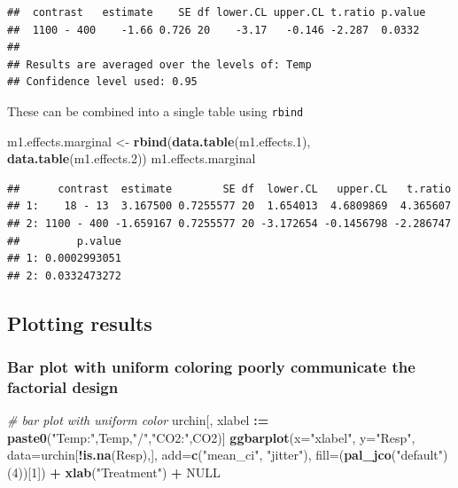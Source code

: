 \documentclass[]{book}
\newenvironment{Shaded}{\begin{snugshade}}{\end{snugshade}}
\newcommand{\KeywordTok}[1]{\textcolor[rgb]{0.13,0.29,0.53}{\textbf{#1}}}
\newcommand{\DataTypeTok}[1]{\textcolor[rgb]{0.13,0.29,0.53}{#1}}
\newcommand{\DecValTok}[1]{\textcolor[rgb]{0.00,0.00,0.81}{#1}}
\newcommand{\StringTok}[1]{\textcolor[rgb]{0.31,0.60,0.02}{#1}}
\newcommand{\CommentTok}[1]{\textcolor[rgb]{0.56,0.35,0.01}{\textit{#1}}}
\newcommand{\OtherTok}[1]{\textcolor[rgb]{0.56,0.35,0.01}{#1}}
\newcommand{\OperatorTok}[1]{\textcolor[rgb]{0.81,0.36,0.00}{\textbf{#1}}}
\newcommand{\ErrorTok}[1]{\textcolor[rgb]{0.64,0.00,0.00}{\textbf{#1}}}
\newcommand{\NormalTok}[1]{#1}
\begin{document}
\begin{verbatim}
##  contrast   estimate    SE df lower.CL upper.CL t.ratio p.value
##  1100 - 400    -1.66 0.726 20    -3.17   -0.146 -2.287  0.0332 
## 
## Results are averaged over the levels of: Temp 
## Confidence level used: 0.95
\end{verbatim}

These can be combined into a single table using \texttt{rbind}

\begin{Shaded}
\begin{Highlighting}[]
\NormalTok{m1.effects.marginal <-}\StringTok{ }\KeywordTok{rbind}\NormalTok{(}\KeywordTok{data.table}\NormalTok{(m1.effects.}\DecValTok{1}\NormalTok{), }\KeywordTok{data.table}\NormalTok{(m1.effects.}\DecValTok{2}\NormalTok{))}
\NormalTok{m1.effects.marginal}
\end{Highlighting}
\end{Shaded}

\begin{verbatim}
##      contrast  estimate        SE df  lower.CL   upper.CL   t.ratio
## 1:    18 - 13  3.167500 0.7255577 20  1.654013  4.6809869  4.365607
## 2: 1100 - 400 -1.659167 0.7255577 20 -3.172654 -0.1456798 -2.286747
##         p.value
## 1: 0.0002993051
## 2: 0.0332473272
\end{verbatim}

\subsection{Plotting results}\label{plotting-results}

\subsubsection{Bar plot with uniform coloring poorly communicate the
factorial
design}\label{bar-plot-with-uniform-coloring-poorly-communicate-the-factorial-design}

\begin{Shaded}
\begin{Highlighting}[]
\CommentTok{# bar plot with uniform color}
\NormalTok{urchin[, xlabel }\OperatorTok{:}\ErrorTok{=}\StringTok{ }\KeywordTok{paste0}\NormalTok{(}\StringTok{"Temp:"}\NormalTok{,Temp,}\StringTok{"/"}\NormalTok{,}\StringTok{"CO2:"}\NormalTok{,CO2)]}
\KeywordTok{ggbarplot}\NormalTok{(}\DataTypeTok{x=}\StringTok{"xlabel"}\NormalTok{,}
          \DataTypeTok{y=}\StringTok{"Resp"}\NormalTok{,}
          \DataTypeTok{data=}\NormalTok{urchin[}\OperatorTok{!}\KeywordTok{is.na}\NormalTok{(Resp),],}
          \DataTypeTok{add=}\KeywordTok{c}\NormalTok{(}\StringTok{"mean_ci"}\NormalTok{, }\StringTok{"jitter"}\NormalTok{),}
          \DataTypeTok{fill=}\NormalTok{(}\KeywordTok{pal_jco}\NormalTok{(}\StringTok{"default"}\NormalTok{)(}\DecValTok{4}\NormalTok{))[}\DecValTok{1}\NormalTok{]) }\OperatorTok{+}
\StringTok{  }\KeywordTok{xlab}\NormalTok{(}\StringTok{"Treatment"}\NormalTok{) }\OperatorTok{+}
\StringTok{  }\OtherTok{NULL}
\end{Highlighting}
\end{Shaded}
\end{document}
